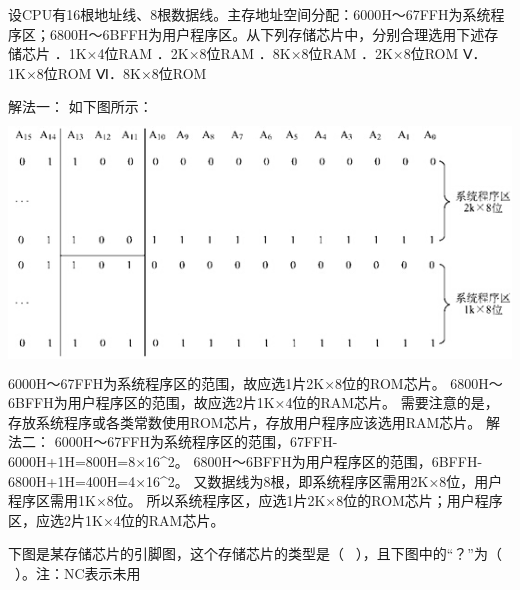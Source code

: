 \question 设CPU有16根地址线、8根数据线。主存地址空间分配：6000H～67FFH为系统程序区；6800H～6BFFH为用户程序区。从下列存储芯片中，分别合理选用下述存储芯片
．1K×4位RAM ．2K×8位RAM ．8K×8位RAM ．2K×8位ROM Ⅴ．1K×8位ROM
Ⅵ．8K×8位ROM
\par{}
\begin{solution}解法一： 如下图所示：
\includegraphics[width=5.67708in,height=2.62500in]{computerassets/bd12baddaa6720a3d704b4d11c38d257.jpeg}
6000H～67FFH为系统程序区的范围，故应选1片2K×8位的ROM芯片。
6800H～6BFFH为用户程序区的范围，故应选2片1K×4位的RAM芯片。
需要注意的是，存放系统程序或各类常数使用ROM芯片，存放用户程序应该选用RAM芯片。
解法二： 6000H～67FFH为系统程序区的范围，67FFH-6000H+1H=800H=8×16\^{}2。
6800H～6BFFH为用户程序区的范围，6BFFH-6800H+1H=400H=4×16\^{}2。
又数据线为8根，即系统程序区需用2K×8位，用户程序区需用1K×8位。
所以系统程序区，应选1片2K×8位的ROM芯片；用户程序区，应选2片1K×4位的RAM芯片。
\end{solution}
\question 下图是某存储芯片的引脚图，这个存储芯片的类型是（
~），且下图中的``？''为（ ~）。注：NC表示未用

